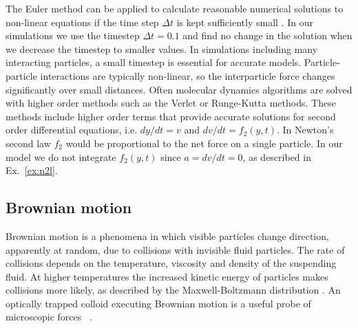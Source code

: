\documentclass[twocolumn,preprintnumbers,amsmath,amssymb,aps,prx]{revtex4}
\begin{document}
    The Euler method can be applied to
    calculate reasonable numerical solutions to 
    non-linear
    equations if the time step $\Delta t$
    is kept sufficiently small \cite{Newman}.
    In our simulations we use the timestep $\Delta t = 0.1$
    and find no change in the solution
    when we decrease the timestep to smaller values.
    In simulations
    including many interacting particles,
    a small
    timestep is essential for accurate models.
    Particle-particle interactions are typically non-linear,
    so the interparticle force changes significantly over small distances.
  Often molecular dynamics algorithms 
  are solved with higher order methods
  such as the Verlet or Runge-Kutta methods.
  These methods include  higher order terms
  that provide accurate solutions for
  second order differential equations,
  i.e. $dy/dt = v$ and $dv/dt = f_2(y,t)$.
  In Newton's second law $f_2$ would be proportional
  to the net force on a single particle.
  In our model 
  we do not integrate $f_2(y,t)$ since 
  $a = dv/dt = 0$,
  as described in Ex.~\ref{ex:n2l}.
  
  \subsection{Brownian motion}
  \label{ex:brownian}
  Brownian motion is a phenomena in which 
  visible particles change direction,
  apparently at random, 
  due to collisions with invisible fluid particles.
  The rate of collisions depends on the temperature, viscosity
  and density of 
  the suspending fluid.
  At higher temperatures
  the increased kinetic energy of particles
  makes collisions more likely, 
  as described by the Maxwell-Boltzmann distribution \cite{Einstein1905}.
  An optically trapped colloid executing Brownian motion
  is a useful probe of microscopic forces ~\cite{Volpe2013}.
  
\end{document}
